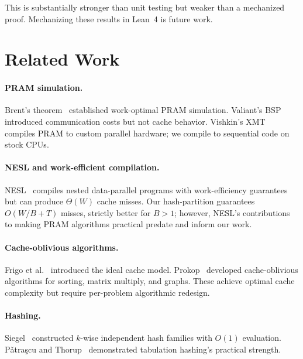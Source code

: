 \documentclass[11pt]{article}
\begin{document}
\noindent This is substantially stronger than unit testing but weaker than
a mechanized proof.  Mechanizing these results in Lean~4 is future work.

\section{Related Work}
\label{sec:related}

\paragraph{PRAM simulation.}
Brent's theorem~\cite{brent1974parallel} established work-optimal PRAM
simulation.  Valiant's BSP~\cite{valiant1990bridging} introduced
communication costs but not cache behavior.  Vishkin's
XMT~\cite{vishkin2011using} compiles PRAM to custom parallel hardware;
we compile to sequential code on stock CPUs.

\paragraph{NESL and work-efficient compilation.}
NESL~\cite{blelloch1996programming} compiles nested data-parallel programs
with work-efficiency guarantees but can produce $\Theta(W)$ cache misses.
Our hash-partition guarantees $O(W/B + T)$ misses, strictly better for
$B > 1$; however, NESL's contributions to making PRAM algorithms practical
predate and inform our work.

\paragraph{Cache-oblivious algorithms.}
Frigo et al.~\cite{frigo1999cache} introduced the ideal cache model.
Prokop~\cite{prokop1999cache} developed cache-oblivious algorithms for
sorting, matrix multiply, and graphs.  These achieve optimal cache
complexity but require per-problem algorithmic redesign.

\paragraph{Hashing.}
Siegel~\cite{siegel2004universal} constructed $k$-wise independent hash
families with $O(1)$ evaluation.  P\v{a}tra\c{s}cu and
Thorup~\cite{patrascu2012power} demonstrated tabulation hashing's
practical strength.
\end{document}
